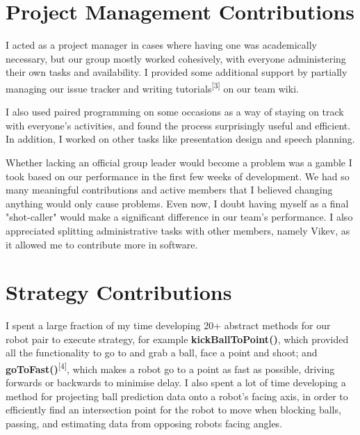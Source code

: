 \documentclass[a4paper,11pt]{article}
\begin{document}

\section{Project Management Contributions}

I acted as a project manager in cases where having one was academically necessary, but our group mostly worked cohesively, with everyone administering their own tasks and availability. I provided some additional support by partially managing our issue tracker and writing tutorials\textsuperscript{[3]} on our team wiki.

I also used paired programming on some occasions as a way of staying on track with everyone's activities, and found the process surprisingly useful and efficient. In addition, I worked on other tasks like presentation design and speech planning.

Whether lacking an official group leader would become a problem was a gamble I took based on our performance in the first few weeks of development. We had so many meaningful contributions and active members that I believed changing anything would only cause problems. Even now, I doubt having myself as a final "shot-caller" would make a significant difference in our team's performance. I also appreciated splitting administrative tasks with other members, namely Vikev, as it allowed me to contribute more in software. 


\section{Strategy Contributions}

I spent a large fraction of my time developing 20+ abstract methods for our robot pair to execute strategy, for example \textbf{kickBallToPoint()}, which provided all the functionality to go to and grab a ball, face a point and shoot; and \textbf{goToFast()}\textsuperscript{[4]}, which makes a robot go to a point as fast as possible, driving forwards or backwards to minimise delay. I also spent a lot of time developing a method for projecting ball prediction data onto a robot's facing axis, in order to efficiently find an intersection point for the robot to move when blocking balls, passing, and estimating data from opposing robots facing angles.
\end{document}
